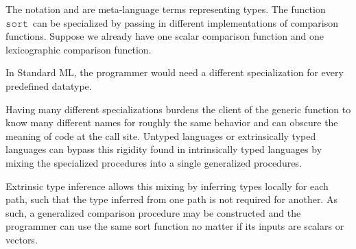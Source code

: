 \documentclass[table,dvipsnames,acmsmall]{acmart}
\theoremstyle{definition}
\begin{document}
\noindent
The notation  and  are meta-language terms representing types.
The function $\J{sort}$ can be specialized by passing in different implementations of comparison functions.
Suppose we already have one scalar comparison function and one lexicographic comparison function.


\noindent
In Standard ML, the programmer would need a different specialization for every predefined
datatype. 


\noindent
Having many different specializations burdens the client of
the generic function to know many different names for roughly the same behavior and can obscure the meaning
of code at the call site. 
Untyped languages or extrinsically typed languages can bypass this rigidity found in 
intrinsically typed languages by mixing the specialized procedures into a single generalized procedures.


\noindent
Extrinsic type inference allows this mixing by inferring types locally for each path,
such that the type inferred from one path is not required for another.
As such, a generalized comparison procedure may be constructed and the
programmer can use the same sort function no matter if its inputs are scalars or vectors.

\end{document}
